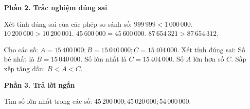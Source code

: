 \textbf{Phần 2. Trắc nghiệm đúng sai}

\begin{ex} %
Xét tính đúng sai của các phép so sánh số:
\choiceTF
{\True $999\,999 < 1\,000\,000$.}
{$10\,200\,000 > 10\,200\,001$.}
{\True $45\,600\,000 = 45\,600\,000$.}
{\True $87\,654\,321 > 87\,654\,312$.}
\end{ex}

\begin{ex} %
Cho các số: $A = 15\,400\,000; B = 15\,040\,000; C = 15\,404\,000$. Xét tính đúng sai:
\choiceTF
{\True Số bé nhất là $B = 15\,040\,000$.}
{\True Số lớn nhất là $C = 15\,404\,000$.}
{Số $A$ lớn hơn số $C$.}
{\True Sắp xếp tăng dần: $B < A < C$.}
\end{ex}

\textbf{Phần 3. Trả lời ngắn}

\begin{ex} %
Tìm số lớn nhất trong các số: $45\,200\,000; 45\,020\,000; 54\,000\,000$.
\end{ex}

